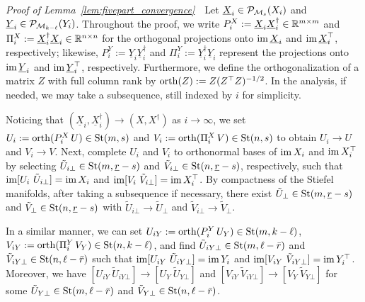 \noindent\textit{Proof of Lemma~\ref{lem:fivepart_convergence}}\ \ 
Let $\underline{X}_i\in\mathcal{P}_{\mathcal{M}_s}(X_i)$ and $\underline{Y}_i\in\mathcal{P}_{\mathcal{M}_{k-\ell}}(Y_i)$. Throughout the proof, we write $P_i^X:=\underline{X}_i\underline{X}_i^\dagger\in\mathbb{R}^{m\times m}$ and
$\Pi_i^X:=\underline{X}_i^\dagger \underline{X}_i\in\mathbb{R}^{n\times n}$ for the orthogonal projections onto
$\operatorname{im} \underline{X}_i$ and $\operatorname{im} \underline{X}_i^\top$, respectively; likewise,
$P_i^Y:=\underline{Y}_i\underline{Y}_i^\dagger$ and $\Pi_i^Y:=\underline{Y}_i^\dagger \underline{Y}_i$ represent the projections onto
$\operatorname{im} \underline{Y}_i$ and $\operatorname{im} \underline{Y}_i^\top$, respectively. Furthermore, we define the orthogonalization of a matrix $Z$ with full column rank by $\operatorname{orth}(Z):=Z(Z^\top Z)^{-1/2}$. In the analysis, if needed, we may take a subsequence, still indexed by $i$ for simplicity.

Noticing that $(\underline{X}_i,\underline{X}_i^\dagger)\to(X,X^\dagger)$ as $i\to\infty$, we set $U_i:=\operatorname{orth}(P_i^X\,U)\in\mathrm{St}(m,s)$ and $V_i:=\operatorname{orth}(\Pi_i^X\,V)\in\mathrm{St}(n,s)$ to obtain $U_i\to U$ and $V_i\to V$. Next, complete $U_i$ and $V_i$ to orthonormal bases
of $\operatorname{im} X_i$ and $\operatorname{im} X_i^\top$ by selecting
$\tilde U_{i\bot}\in\mathrm{St}(m,{\underline{r}}-s)$ and
$\tilde V_{i\bot}\in\mathrm{St}(n,{\underline{r}}-s)$, respectively, such that $\operatorname{im}[U_i\ \tilde U_{i\bot}]=\operatorname{im} X_i$ and $\operatorname{im}[V_i\ \tilde V_{i\bot}]=\operatorname{im} X_i^\top$. By compactness of the Stiefel manifolds, after taking a subsequence if necessary, there exist $\tilde U_\bot\in\mathrm{St}(m,{\underline{r}}-s)$ and
$\tilde V_\bot\in\mathrm{St}(n,{\underline{r}}-s)$ with
$\tilde U_{i\bot}\to \tilde U_\bot$ and $\tilde V_{i\bot}\to \tilde V_\bot$.

In a similar manner, we can set $U_{iY}:=\operatorname{orth}(P_i^Y\,U_Y)\in\mathrm{St}(m,k-\ell)$,
$V_{iY}:=\operatorname{orth}(\Pi_i^Y\,V_Y)\in\mathrm{St}(n,k-\ell)$, and find $\tilde U_{iY\bot}\in\mathrm{St}(m,\ell-\bar{r})$ and $\tilde V_{iY\bot}\in\mathrm{St}(n,\ell-\bar{r})$ such that $\operatorname{im}[U_{iY}\ \tilde U_{iY\bot}]=\operatorname{im} Y_i$ and $\ima[V_{iY}\ \tilde V_{iY\bot}]=\ima Y_i^\top$. Moreover, we have $[U_{iY}\ \tilde U_{iY\bot}]\to [U_Y\ \tilde{U}_{Y\bot}]$ and $[V_{iY}\ \tilde V_{iY\bot}]\to [V_Y\ \tilde{V}_{Y\bot}]$ for some $\tilde U_{Y\bot}\in\mathrm{St}(m,\ell-\bar{r})$ and $\tilde V_{Y\bot}\in\mathrm{St}(n,\ell-\bar{r})$. 

